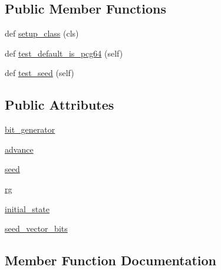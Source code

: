 \subsection*{Public Member Functions}
\begin{DoxyCompactItemize}
\item 
def \hyperlink{classnumpy_1_1random_1_1tests_1_1test__smoke_1_1TestDefaultRNG_a9cf2fd3a8020dc9e5a5c4ca729479f88}{setup\+\_\+class} (cls)
\item 
def \hyperlink{classnumpy_1_1random_1_1tests_1_1test__smoke_1_1TestDefaultRNG_a5f532c29ae3d1252dde13a7866cff51e}{test\+\_\+default\+\_\+is\+\_\+pcg64} (self)
\item 
def \hyperlink{classnumpy_1_1random_1_1tests_1_1test__smoke_1_1TestDefaultRNG_acaceea785d958674cd9f32f0afc70217}{test\+\_\+seed} (self)
\end{DoxyCompactItemize}
\subsection*{Public Attributes}
\begin{DoxyCompactItemize}
\item 
\hyperlink{classnumpy_1_1random_1_1tests_1_1test__smoke_1_1TestDefaultRNG_ab27abb690c28abaf0afb11bfe9a78783}{bit\+\_\+generator}
\item 
\hyperlink{classnumpy_1_1random_1_1tests_1_1test__smoke_1_1TestDefaultRNG_a532c638504454aa7a47d8634650dbb59}{advance}
\item 
\hyperlink{classnumpy_1_1random_1_1tests_1_1test__smoke_1_1TestDefaultRNG_ad29a17451f771eb3325353aa493d7299}{seed}
\item 
\hyperlink{classnumpy_1_1random_1_1tests_1_1test__smoke_1_1TestDefaultRNG_a0261f77c2c808f5626b60d2e10572de7}{rg}
\item 
\hyperlink{classnumpy_1_1random_1_1tests_1_1test__smoke_1_1TestDefaultRNG_ab1a7197b18508d256ad500d41a33d999}{initial\+\_\+state}
\item 
\hyperlink{classnumpy_1_1random_1_1tests_1_1test__smoke_1_1TestDefaultRNG_a6644dab3d87e0c4ba15ee7bb73c88e35}{seed\+\_\+vector\+\_\+bits}
\end{DoxyCompactItemize}


\subsection{Member Function Documentation}
\mbox{\label{classnumpy_1_1random_1_1tests_1_1test__smoke_1_1TestDefaultRNG_a9cf2fd3a8020dc9e5a5c4ca729479f88}} 
